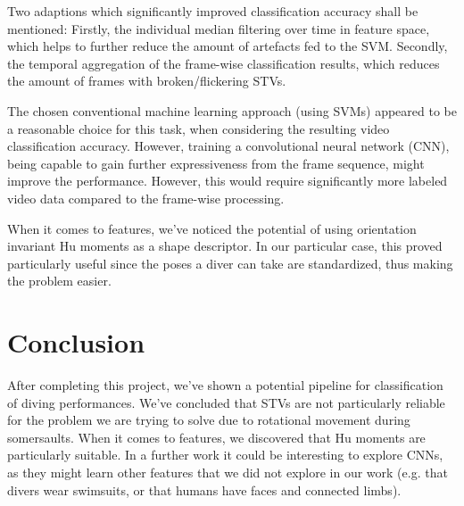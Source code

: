 \documentclass[a4paper, textwidth=18cm, textheight=24cm, top=1cm, bottom=1cm, left=1cm, right=1cm10pt]{article}
\begin{document}
Two adaptions which significantly improved classification accuracy shall be mentioned: Firstly, the individual median filtering over time in feature space, which helps to further reduce the amount of artefacts fed to the SVM. Secondly, the temporal aggregation of the frame-wise classification results, which reduces the amount of frames with broken/flickering STVs.

The chosen conventional machine learning approach (using SVMs) appeared to be a reasonable choice for this task, when considering the resulting video classification accuracy. However, training a convolutional neural network (CNN), being capable to gain further expressiveness from the frame sequence, might improve the performance. However, this would require significantly more labeled video data compared to the frame-wise processing.

When it comes to features, we've noticed the potential of using orientation invariant Hu moments as a shape descriptor. In our particular case, this proved particularly useful since the poses a diver can take are standardized, thus making the problem easier.

\section{Conclusion}

After completing this project, we've shown a potential pipeline for classification of diving performances. We've concluded that STVs are not particularly reliable for the problem we are trying to solve due to rotational movement during somersaults. When it comes to features, we discovered that Hu moments are particularly suitable. In a further work it could be interesting to explore CNNs, as they might learn other features that we did not explore in our work (e.g. that divers wear swimsuits, or that humans have faces and connected limbs).


\end{document}
